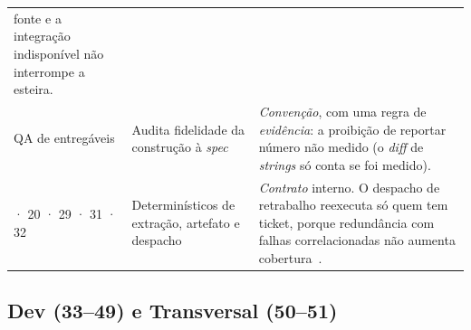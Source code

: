 \documentclass[11pt,a4paper]{article}
\begin{document}
\begin{center}
\begin{longtable}{p{2.5cm}p{5.4cm}p{6.6cm}}
fonte e a integração indisponível não interrompe a esteira. \\
\addlinespace
30 QA de entregáveis & Audita fidelidade da construção à \emph{spec} &
\textit{Convenção}, com uma regra de \textit{evidência}: a proibição de reportar número não medido
(o \emph{diff} de \emph{strings} só conta se foi medido). \\
\addlinespace
18 · 20 · 29 · 31 · 32 & Determinísticos de extração, artefato e despacho &
\textit{Contrato} interno. O despacho de retrabalho reexecuta só quem tem ticket, porque
redundância com falhas correlacionadas não aumenta cobertura~\cite{knight1986b}. \\
\bottomrule
\end{longtable}
\end{center}

\subsection{Dev (33--49) e Transversal (50--51)}
\end{document}
